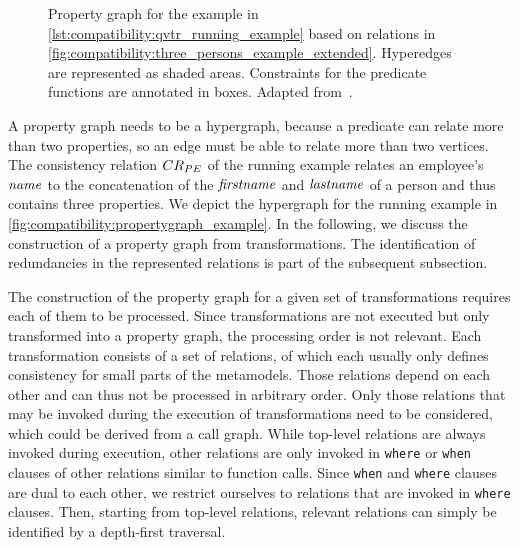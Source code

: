 \begin{figure}
    \centering
    
    
    \caption[Property graph for the running example]{Property graph for the \qvtr example in \autoref{lst:compatibility:qvtr_running_example} based on relations in \autoref{fig:compatibility:three_persons_example_extended}. Hyperedges are represented as shaded areas. Constraints for the predicate functions are annotated in boxes. Adapted from~.}
    \label{fig:compatibility:propertygraph_example}
\end{figure}

A property graph needs to be a hypergraph, because a predicate can relate more than two properties, so an edge must be able to relate more than two vertices.
The consistency relation $\consistencyrelation{CR}{PE}$ of the running example relates an employee's $\mathit{name}$ to the concatenation of the $\mathit{firstname}$ and $\mathit{lastname}$ of a person and thus contains three properties.
We depict the hypergraph for the running example in \autoref{fig:compatibility:propertygraph_example}.
In the following, we discuss the construction of a property graph from \qvtr transformations.
The identification of redundancies in the represented relations is part of the subsequent subsection.

The construction of the property graph for a given set of \qvtr transformations requires each of them to be processed.
Since transformations are not executed but only transformed into a property graph, the processing order is not relevant.
Each transformation consists of a set of \qvtr relations, of which each usually only defines consistency for small parts of the metamodels.
Those relations depend on each other and can thus not be processed in arbitrary order.
Only those relations that may be invoked during the execution of transformations need to be considered, which could be derived from a call graph.
While top-level relations are always invoked during execution, other relations are only invoked in \texttt{where} or \texttt{when} clauses of other relations similar to function calls. 
Since \texttt{when} and \texttt{where} clauses are dual to each other, we restrict ourselves to relations that are invoked in \texttt{where} clauses. 
Then, starting from top-level relations, relevant relations can simply be identified by a depth-first traversal. 

